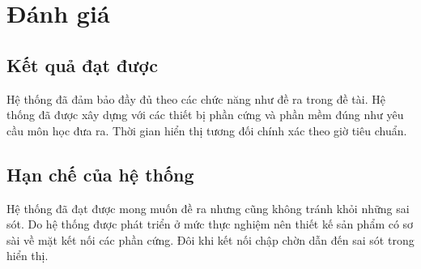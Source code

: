 \section{Đánh giá}

\subsection{Kết quả đạt được}
Hệ thống đã đảm bảo đầy đủ theo các chức năng như đề ra trong đề tài. Hệ thống đã được xây dựng với các thiết bị phần cứng và phần mềm đúng như yêu cầu môn học đưa ra.
Thời gian hiển thị tương đối chính xác theo giờ tiêu chuẩn.

\subsection{Hạn chế của hệ thống}
Hệ thống đã đạt được mong muốn đề ra nhưng cũng không tránh khỏi những sai sót. Do hệ thống được phát triển ở mức thực nghiệm nên thiết kế sản phẩm có sơ sài về mặt kết nối các phần cứng. Đôi khi kết nối chập chờn dẫn đến sai sót trong hiển thị.

